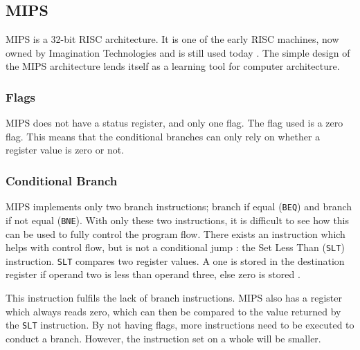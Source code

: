 \documentclass[12pt,a4paper]{article}
\begin{document}
\begin{bibunit}[is-unsrt]
\begin{lstlisting}[frame=single,caption=Intel 8086 assembler for listing \ref{ListC2},label=intel2]
\end{lstlisting}

\subsection{MIPS}

MIPS is a 32-bit RISC architecture.
It is one of the early RISC machines, now owned by Imagination Technologies and is still used today \cite{mips:wiki}.
The simple design of the MIPS architecture lends itself as a learning tool for computer architecture.

\subsubsection{Flags}

MIPS does not have a status register, and only one flag.
The flag used is a zero flag. 
This means that the conditional branches can only rely on whether a register value is zero or not.


\subsubsection{Conditional Branch}

MIPS implements only two branch instructions; branch if equal (\texttt{BEQ}) and branch if not equal (\texttt{BNE}).
With only these two instructions, it is difficult to see how this can be used to fully control the program flow.
There exists an instruction which helps with control flow, but is not a conditional jump : the Set Less Than (\texttt{SLT}) instruction.
\texttt{SLT} compares two register values.
A one is stored in the destination register if operand two is less than operand three, else zero is stored \cite{patterson2013computer}.

This instruction fulfils the lack of branch instructions.
MIPS also has a register which always reads zero, which can then be compared to the value returned by the \texttt{SLT} instruction.
By not having flags, more instructions need to be executed to conduct a branch. 
However, the instruction set on a whole will be smaller.



\end{bibunit}
\end{document}
